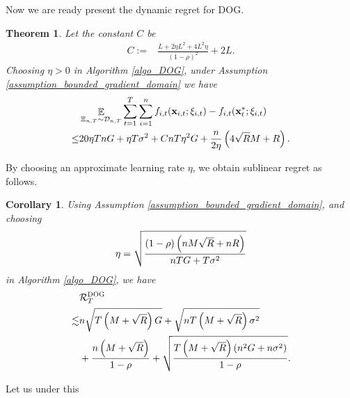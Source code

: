 \documentclass{article}
\newtheorem{Theorem}{\bf{Theorem}}
\newtheorem{Corollary}{\bf{Corollary}}
\begin{document}
Now we are ready present the dynamic regret for DOG.
\begin{Theorem}
\label{theorem_regret_upper_bound}
Let the constant $C$ be
\begin{align}
\nonumber
C := & \frac{L + 2\eta L^2  + 4L^2 \eta}{(1-\rho)^2} +2L.
\end{align} Choosing $\eta>0$ in Algorithm \ref{algo_DOG}, under Assumption \ref{assumption_bounded_gradient_domain} we have
\begin{align}
\nonumber
& \mathop{\mathbb{E}}_{ \Xi_{n,T} \sim \mathcal{D}_{n,T} } \sum_{t=1}^T\sum_{i=1}^n f_{i,t}({\bf x}_{i,t};\xi_{i,t}) - f_{i,t}({\bf x}_t^\ast;\xi_{i,t}) \\ \nonumber
\le & 20\eta T n G +  \eta T\sigma^2 + C nT\eta^2 G    + \frac{n}{2\eta}\left(  4\sqrt{R}M + R   \right).
\end{align}
\end{Theorem}

By choosing an approximate learning rate $\eta$, we obtain sublinear regret as follows.
\begin{Corollary}
\label{Corollary_regret_upper_bound}
Using Assumption \ref{assumption_bounded_gradient_domain}, and choosing 
\begin{align}
\nonumber
\eta = \sqrt{\frac{(1-\rho) \left( nM\sqrt{R} + nR \right)}{ nTG + T\sigma^2 }}
\end{align} in Algorithm \ref{algo_DOG}, we have
\begin{align}
\nonumber
& {\mathcal{R}}_T^{\textsc{DOG}} \\ \nonumber
\lesssim & n \sqrt{T\left( M+\sqrt{R} \right)G}  + \sqrt{n T\left( M+\sqrt{R} \right)\sigma^2} \\ \label{equa_result_Corollary}
& + \frac{n\left( M+\sqrt{R} \right)}{1-\rho} + \sqrt{\frac{T\left( M+\sqrt{R} \right)(n^2G + n\sigma^2)}{1-\rho}}.
\end{align}
\end{Corollary}
Let us under this 
\end{document}
